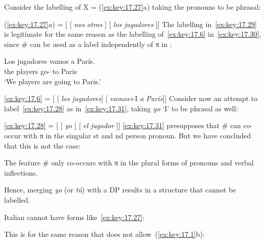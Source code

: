 \documentclass[output=paper]{langsci/langscibook}
\begin{document}
\label{ex:key:17.28}
\z
Consider the labelling of X = (\ref{ex:key:17.27}a) taking the pronouns to be
phrasal:

\ea\label{ex:key:17.29}
    (\ref{ex:key:17.27}a) = [ [ \emph{nos}\tss{\#} \emph{otros} ] [ \emph{los}\tss{\#} \emph{jugadores} ]]
\z
The labelling in~\eqref{ex:key:17.29} is legitimate for the same reason as the
labelling of~\eqref{ex:key:17.6} in~\eqref{ex:key:17.30}, since \# can be used as a
label independently of π in :

\begin{exe}
\exi{\eqref{ex:key:17.6}}
    \gll    Los jugadores vamos a París.\\
            the players      go-\Fpl{} to Paris\\
    \glt    ‘We players are going to Paris.’
\end{exe}

\ea\label{ex:key:17.30}
    \eqref{ex:key:17.6} = [ [ \emph{los}\tss{\#} \emph{jugadores}] [ \emph{vamos}+I\tss{\#}  \emph{a París}]]
\z
Consider now an attempt to label~\eqref{ex:key:17.28} as
in~\eqref{ex:key:17.31}, taking \emph{yo} ‘I’ to be phrasal as well:

\ea\label{ex:key:17.31}
    \eqref{ex:key:17.28} = [ [ \emph{yo} ] [ \emph{el}\tss{\#} \emph{jugador} ]]
\z
\eqref{ex:key:17.31} presupposes that \# can co-occur with π in the singular
\First{}st and \Second{}nd person pronoun. But we have concluded that this is
not the case:

\begin{exe}
\exi{\eqref{ex:key:17.21}}
    The feature \# only co-occurs with π in the plural forms of pronouns
    and verbal inflections.
\end{exe}
Hence, merging \emph{yo} (or \emph{tú}) with a DP results in a structure that
cannot be labelled.

Italian cannot have forms like~\eqref{ex:key:17.27}:

\ea\label{ex:key:17.32}
    \z
\z
This is for the same reason that  does not allow~(\ref{ex:key:17.1}b):
\end{document}
